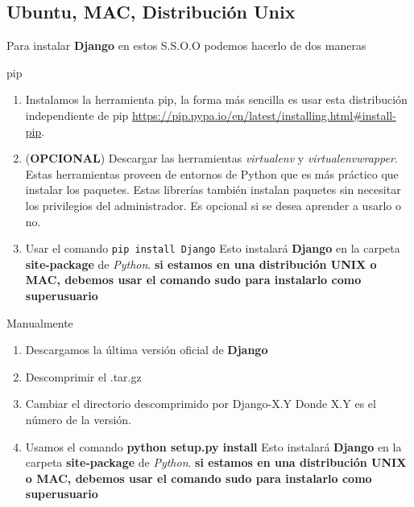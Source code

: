\subsection{Ubuntu, MAC, Distribución Unix}
Para instalar \textbf{Django} en estos S.S.O.O podemos hacerlo de dos maneras
\begin{description}
	\item pip 
	\begin{enumerate}
		\item Instalamos la herramienta pip, la forma más sencilla es usar esta distribución independiente de pip \href{https://pip.pypa.io/en/latest/installing.html#install-pip}{https://pip.pypa.io/en/latest/installing.html\#install-pip}.
		\item (\textbf{OPCIONAL}) Descargar las herramientas \textit{virtualenv} y \textit{virtualenvwrapper}. Estas herramientas proveen de entornos de Python que es más práctico que instalar los paquetes.
Estas librerías también instalan paquetes sin necesitar los privilegios del administrador. Es opcional si se desea aprender a usarlo o no.
		\item Usar el comando \texttt{pip install Django} Esto instalará \textbf{Django} en la carpeta \textbf{site-package} de \textit{Python}. \textbf{si estamos en una distribución UNIX o MAC, debemos usar el comando sudo para instalarlo como superusuario}
		\end{enumerate}
	\item Manualmente
		\begin{enumerate}
			\item Descargamos la última versión oficial de \textbf{Django}
			\item Descomprimir el .tar.gz
			\item Cambiar el directorio descomprimido por Django-X.Y Donde X.Y es el número de la versión.
			\item Usamos el comando \textbf{python setup.py install} Esto instalará \textbf{Django} en la carpeta \textbf{site-package} de \textit{Python}. \textbf{si estamos en una distribución UNIX o MAC, debemos usar el comando sudo para instalarlo como superusuario}
			\end{enumerate}
\end{description}


